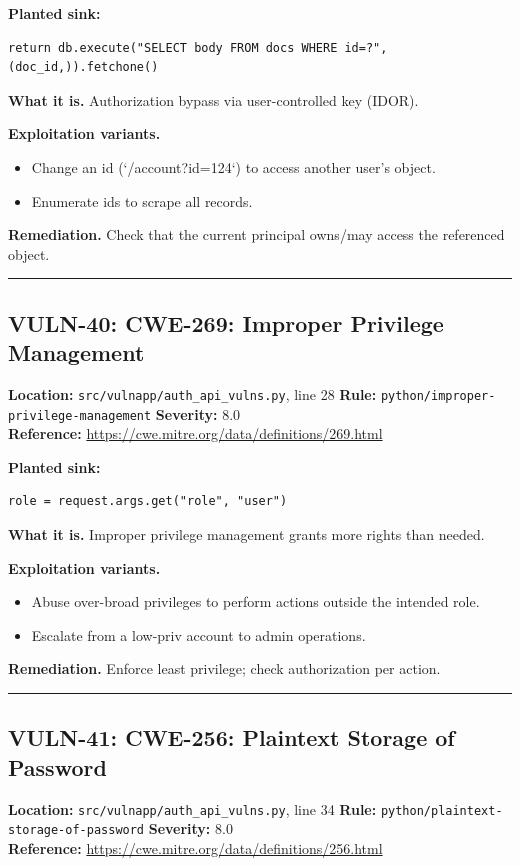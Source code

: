 \documentclass[11pt,a4paper]{article}
\begin{document}
\noindent\textbf{Planted sink:}
\begin{lstlisting}
return db.execute("SELECT body FROM docs WHERE id=?", (doc_id,)).fetchone()
\end{lstlisting}
\noindent\textbf{What it is.} Authorization bypass via user-controlled key (IDOR).

\noindent\textbf{Exploitation variants.}
\begin{itemize}[leftmargin=1.4em,itemsep=1pt,topsep=2pt]
\item Change an id (`/account?id=124`) to access another user's object.
\item Enumerate ids to scrape all records.
\end{itemize}
\noindent\textbf{Remediation.} Check that the current principal owns/may access the referenced object.

\vspace{4pt}\hrule\vspace{6pt}
\subsection{VULN-40: CWE-269: Improper Privilege Management}
\noindent\textbf{Location:} \texttt{src/vulnapp/auth\_api\_vulns.py}, line 28 \quad \textbf{Rule:} \texttt{python/improper-privilege-management} \quad \textbf{Severity:} 8.0
\\ \textbf{Reference:} \url{https://cwe.mitre.org/data/definitions/269.html}

\noindent\textbf{Planted sink:}
\begin{lstlisting}
role = request.args.get("role", "user")
\end{lstlisting}
\noindent\textbf{What it is.} Improper privilege management grants more rights than needed.

\noindent\textbf{Exploitation variants.}
\begin{itemize}[leftmargin=1.4em,itemsep=1pt,topsep=2pt]
\item Abuse over-broad privileges to perform actions outside the intended role.
\item Escalate from a low-priv account to admin operations.
\end{itemize}
\noindent\textbf{Remediation.} Enforce least privilege; check authorization per action.

\vspace{4pt}\hrule\vspace{6pt}
\subsection{VULN-41: CWE-256: Plaintext Storage of Password}
\noindent\textbf{Location:} \texttt{src/vulnapp/auth\_api\_vulns.py}, line 34 \quad \textbf{Rule:} \texttt{python/plaintext-storage-of-password} \quad \textbf{Severity:} 8.0
\\ \textbf{Reference:} \url{https://cwe.mitre.org/data/definitions/256.html}
\end{document}
